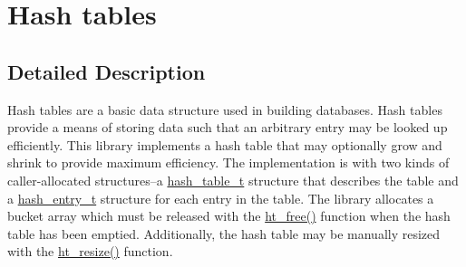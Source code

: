 \hypertarget{group__dbprim__hash}{
\section{Hash tables}
\label{group__dbprim__hash}
}


\subsection{Detailed Description}
Hash tables are a basic data structure used in building databases. Hash tables provide a means of storing data such that an arbitrary entry may be looked up efficiently. This library implements a hash table that may optionally grow and shrink to provide maximum efficiency. The implementation is with two kinds of caller-allocated structures--a \hyperlink{group__dbprim__hash_a0}{hash\_\-table\_\-t} structure that describes the table and a \hyperlink{group__dbprim__hash_a1}{hash\_\-entry\_\-t} structure for each entry in the table. The library allocates a bucket array which must be released with the \hyperlink{group__dbprim__hash_a14}{ht\_\-free()} function when the hash table has been emptied. Additionally, the hash table may be manually resized with the \hyperlink{group__dbprim__hash_a13}{ht\_\-resize()} function.

